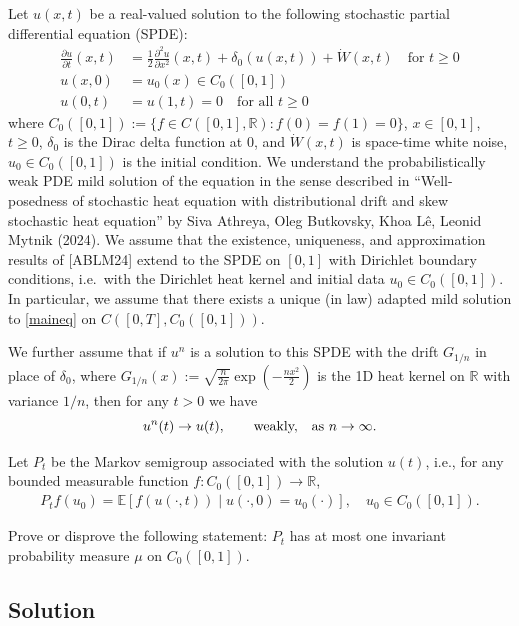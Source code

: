 \documentclass[12pt]{article}
\newcommand{\R}{\mathbb{R}}
\begin{document}
Let $u(x,t)$ be a real-valued solution to the following stochastic partial differential equation (SPDE):
\begin{align}\tag{$*$}\label{maineq}
    \frac{\partial u}{\partial t}(x,t) &= \frac{1}{2} \frac{\partial^2 u}{\partial x^2}(x,t) + \delta_0(u(x,t)) +  \dot{W}(x,t) \quad\text{for }t \geq 0\\
    u(x,0) &= u_0(x)\in C_0([0,1])\nonumber\\
    u(0,t) &= u(1,t)=0\quad\text{for all }t\geq0    \nonumber
\end{align}
where $C_0([0,1]):=\{f\in C([0,1],\R): f(0)=f(1)=0\}$, $x \in [0,1]$, $t \geq 0$, $\delta_0$ is the Dirac delta function at $0$, and $\dot{W}(x,t)$ is space-time white noise, $u_0\in C_0([0,1])$ is the initial condition. We understand the probabilistically weak PDE mild solution of the equation in the sense described in ``Well-posedness of stochastic heat equation with distributional drift and skew stochastic heat equation'' by Siva Athreya, Oleg Butkovsky, Khoa L\^{e}, Leonid Mytnik (2024). 
We assume that the existence, uniqueness, and approximation results of [ABLM24] extend to the SPDE on $[0,1]$ with Dirichlet boundary conditions, i.e.\ with the Dirichlet heat kernel and initial data $u_0\in C_0([0,1])$. In particular, we assume that there exists a unique (in law) adapted mild solution to \eqref{maineq} on $C([0,T],C_0([0,1]))$.

We further assume that if $u^n$ is a solution to this SPDE with the drift $G_{1/n}$ in place of $\delta_0$, where $G_{1/n}(x):=\sqrt{\frac{n}{2\pi}} \exp(-\frac{n x^2}{2})$ is the 1D heat kernel on $\mathbb{R}$ with variance $1/n$, then for any $t>0$ we have 
\begin{equation*}
u^n(t)\to u(t),\qquad\text{weakly, \,\, as $n\to\infty$}.
\end{equation*}

Let $P_t$ be the Markov semigroup associated with the solution $u(t)$, i.e., for any bounded measurable function $f\colon C_0([0,1])\to\R$,
\begin{align}
    P_t f(u_0) = \mathbb{E}[f(u(\cdot,t)) \mid u(\cdot,0) = u_0(\cdot)],\quad u_0\in C_0([0,1]).
\end{align}

Prove or disprove the following statement:  $P_t$ has at most one invariant probability measure $\mu$ on $C_0([0,1])$.

\subsection*{Solution}
\end{document}
